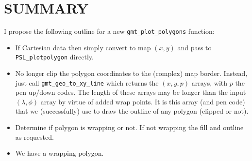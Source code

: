 \documentclass[12pt,letterpaper,margin=0.5in]{article}
\begin{document}
\section{SUMMARY}

I propose the following outline for a new \texttt{gmt\_plot_polygons} function:
\begin{itemize}
	\item If Cartesian data then simply convert to map $(x,y)$ and pass to \texttt{PSL\_plotpolygon} directly.
	\item No longer clip the polygon coordinates to the (complex) map border.  Instead,
	 just call \texttt{gmt\_geo\_to\_xy\_line} which returns the $(x,y,p)$ arrays, with
	$p$ the pen up/down codes.  The length of these arrays may be longer than the input
	$(\lambda, \phi)$ array by virtue of added wrap points. It is this array (and pen code)
	that we (successfully) use to draw the outline of any polygon (clipped or not).
	\item Determine if polygon is wrapping or not.  If not wrapping the fill and outline as requested.
	\item We have a wrapping polygon.
\end{itemize}
\end{document}
